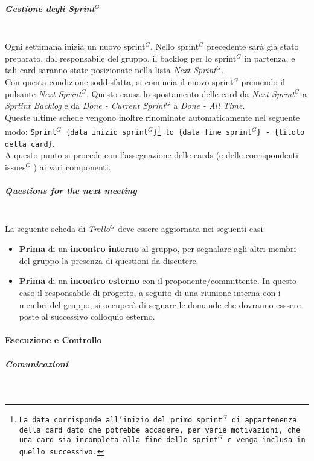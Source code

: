 \subparagraph{Gestione degli Sprint$^G$}
\mbox{}\\
Ogni settimana inizia un nuovo sprint$^G$. Nello sprint$^G$ precedente sarà già stato preparato, dal responsabile del gruppo, il backlog per lo sprint$^G$ in partenza, e tali card saranno state posizionate nella lista \textit{Next Sprint}$^G$. \\
Con questa condizione soddisfatta, si comincia il nuovo sprint$^G$ premendo il pulsante \textit{Next Sprint}$^G$. Questo causa lo spostamento delle card da \textit{Next Sprint}$^G$ a \textit{Sprtint Backlog} e da \textit{Done - Current Sprint}$^G$ a \textit{Done - All Time}.\\
Queste ultime schede vengono inoltre rinominate automaticamente nel seguente modo: \texttt{Sprint$^G$ \{data inizio sprint$^G$\}\footnote{La data corrisponde all'inizio del primo sprint$^G$ di appartenenza della card dato che potrebbe accadere, per varie motivazioni, che una card sia incompleta alla fine dello sprint$^G$ e venga inclusa in quello successivo.} to \{data fine sprint$^G$\} - \{titolo della card\}}.\\
A questo punto si procede con l'assegnazione delle cards (e delle corrispondenti issues$^G$ ) ai vari componenti.

\subparagraph{Questions for the next meeting}
\mbox{}\\
La seguente scheda di \textit{Trello}$^G$ deve essere aggiornata nei seguenti casi:
\begin{itemize}
    \item \textbf{Prima} di un \textbf{incontro interno} al gruppo, per segnalare agli altri membri del gruppo
    la presenza di questioni da discutere.
    \item \textbf{Prima} di un \textbf{incontro esterno} con il proponente/committente. In questo caso il responsabile
    di progetto, a seguito di una riunione interna con i membri del gruppo, si occuperà di segnare le
    domande che dovranno esssere poste al successivo colloquio esterno.
\end{itemize}

\newpage
\paragraph{Esecuzione e Controllo}

\subparagraph{Comunicazioni}
\mbox{}\\

